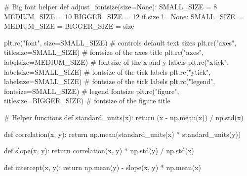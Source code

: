 \documentclass[
  letterpaper,
  DIV=11,
  numbers=noendperiod]{scrreprt}
\newenvironment{Shaded}{\begin{snugshade}}{\end{snugshade}}
\newcommand{\CommentTok}[1]{\textcolor[rgb]{0.37,0.37,0.37}{#1}}
\newcommand{\ControlFlowTok}[1]{\textcolor[rgb]{0.00,0.23,0.31}{#1}}
\newcommand{\DecValTok}[1]{\textcolor[rgb]{0.68,0.00,0.00}{#1}}
\newcommand{\KeywordTok}[1]{\textcolor[rgb]{0.00,0.23,0.31}{#1}}
\newcommand{\NormalTok}[1]{\textcolor[rgb]{0.00,0.23,0.31}{#1}}
\newcommand{\OperatorTok}[1]{\textcolor[rgb]{0.37,0.37,0.37}{#1}}
\newcommand{\StringTok}[1]{\textcolor[rgb]{0.13,0.47,0.30}{#1}}
\newcommand{\VariableTok}[1]{\textcolor[rgb]{0.07,0.07,0.07}{#1}}
\begin{document}
\begin{Shaded}
\begin{Highlighting}[]
\CommentTok{\# Big font helper}
\KeywordTok{def}\NormalTok{ adjust\_fontsize(size}\OperatorTok{=}\VariableTok{None}\NormalTok{):}
\NormalTok{    SMALL\_SIZE }\OperatorTok{=} \DecValTok{8}
\NormalTok{    MEDIUM\_SIZE }\OperatorTok{=} \DecValTok{10}
\NormalTok{    BIGGER\_SIZE }\OperatorTok{=} \DecValTok{12}
    \ControlFlowTok{if}\NormalTok{ size }\OperatorTok{!=} \VariableTok{None}\NormalTok{:}
\NormalTok{        SMALL\_SIZE }\OperatorTok{=}\NormalTok{ MEDIUM\_SIZE }\OperatorTok{=}\NormalTok{ BIGGER\_SIZE }\OperatorTok{=}\NormalTok{ size}

\NormalTok{    plt.rc(}\StringTok{"font"}\NormalTok{, size}\OperatorTok{=}\NormalTok{SMALL\_SIZE)  }\CommentTok{\# controls default text sizes}
\NormalTok{    plt.rc(}\StringTok{"axes"}\NormalTok{, titlesize}\OperatorTok{=}\NormalTok{SMALL\_SIZE)  }\CommentTok{\# fontsize of the axes title}
\NormalTok{    plt.rc(}\StringTok{"axes"}\NormalTok{, labelsize}\OperatorTok{=}\NormalTok{MEDIUM\_SIZE)  }\CommentTok{\# fontsize of the x and y labels}
\NormalTok{    plt.rc(}\StringTok{"xtick"}\NormalTok{, labelsize}\OperatorTok{=}\NormalTok{SMALL\_SIZE)  }\CommentTok{\# fontsize of the tick labels}
\NormalTok{    plt.rc(}\StringTok{"ytick"}\NormalTok{, labelsize}\OperatorTok{=}\NormalTok{SMALL\_SIZE)  }\CommentTok{\# fontsize of the tick labels}
\NormalTok{    plt.rc(}\StringTok{"legend"}\NormalTok{, fontsize}\OperatorTok{=}\NormalTok{SMALL\_SIZE)  }\CommentTok{\# legend fontsize}
\NormalTok{    plt.rc(}\StringTok{"figure"}\NormalTok{, titlesize}\OperatorTok{=}\NormalTok{BIGGER\_SIZE)  }\CommentTok{\# fontsize of the figure title}


\CommentTok{\# Helper functions}
\KeywordTok{def}\NormalTok{ standard\_units(x):}
    \ControlFlowTok{return}\NormalTok{ (x }\OperatorTok{{-}}\NormalTok{ np.mean(x)) }\OperatorTok{/}\NormalTok{ np.std(x)}


\KeywordTok{def}\NormalTok{ correlation(x, y):}
    \ControlFlowTok{return}\NormalTok{ np.mean(standard\_units(x) }\OperatorTok{*}\NormalTok{ standard\_units(y))}


\KeywordTok{def}\NormalTok{ slope(x, y):}
    \ControlFlowTok{return}\NormalTok{ correlation(x, y) }\OperatorTok{*}\NormalTok{ np.std(y) }\OperatorTok{/}\NormalTok{ np.std(x)}


\KeywordTok{def}\NormalTok{ intercept(x, y):}
    \ControlFlowTok{return}\NormalTok{ np.mean(y) }\OperatorTok{{-}}\NormalTok{ slope(x, y) }\OperatorTok{*}\NormalTok{ np.mean(x)}



\end{Highlighting}
\end{Shaded}
\end{document}
